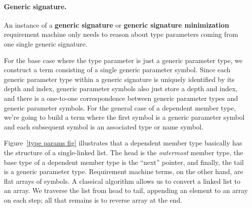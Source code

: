 \documentclass[../generics]{subfiles}
\begin{document}
\paragraph{Generic signature.}
%
%
%
%
An instance of a \textbf{generic signature} or \textbf{generic signature minimization} requirement machine only needs to reason about type parameters coming from one single generic signature.

For the base case where the type parameter is just a generic parameter type, we construct a term consisting of a single generic parameter symbol. Since each generic parameter type within a generic signature is uniquely identified by its depth and index, generic parameter symbols also just store a depth and index, and there is a one-to-one correspondence between generic parameter types and generic parameter symbols. 
For the general case of a dependent member type, we're going to build a term where the first symbol is a generic parameter symbol and each subsequent symbol is an associated type or name symbol.

%
%
%
%
%
%
Figure~\ref{type params fig} illustrates that a dependent member type basically has the structure of a single-linked list. The head is the \emph{outermost} member type, the base type of a dependent member type is the ``next'' pointer, and finally, the tail is a generic parameter type. Requirement machine terms, on the other hand, are flat arrays of symbols. A classical algorithm allows us to convert a linked list to an array. We traverse the list from head to tail, appending an element to an array on each step; all that remains is to reverse array at the end.
\end{document}
